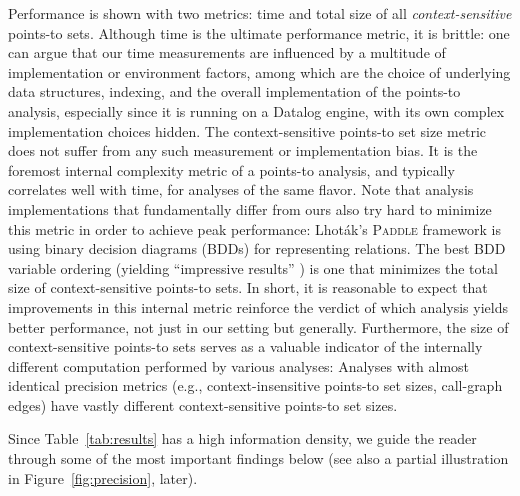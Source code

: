 Performance is shown with two metrics: time and total size of all
\emph{context-sensitive} points-to sets. Although time is the ultimate
performance metric, it is brittle: one can argue that our time
measurements are influenced by a multitude of implementation or
environment factors, among which are the choice of underlying data
structures, indexing, and the overall implementation of the points-to
analysis, especially since it is running on a Datalog engine, with its
own complex implementation choices hidden. The context-sensitive
points-to set size metric does not suffer from any such measurement or
implementation bias. It is the foremost internal complexity metric of
a points-to analysis, and typically correlates well with time, for
analyses of the same flavor.  Note that analysis implementations that
fundamentally differ from ours also try hard to minimize this metric
in order to achieve peak performance: Lhot\'{a}k's \textsc{Paddle}
framework \cite{thesis:Lhotak} is using binary decision diagrams
(BDDs) for representing relations. The best BDD variable ordering
(yielding ``impressive results'' \cite{pldi:2003:Berndl})
is one that minimizes the total size of context-sensitive points-to
sets. In short, it is reasonable to expect that improvements in this
internal metric reinforce the verdict of which analysis yields better
performance, not just in our setting but generally. Furthermore, the
size of context-sensitive points-to sets serves as a valuable
indicator of the internally different computation performed by various
analyses: Analyses with almost identical precision metrics (e.g.,
context-insensitive points-to set sizes, call-graph edges) have vastly
different context-sensitive points-to set sizes.


Since Table~\ref{tab:results} has a high information density, we guide
the reader through some of the most important findings below (see also
a partial illustration in Figure~\ref{fig:precision}, later).

